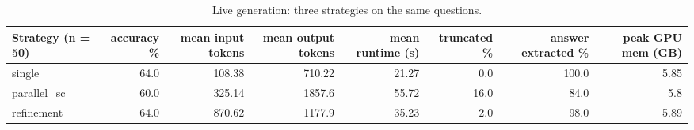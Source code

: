 \begin{table}[t]
\centering\small
\begin{tabular}{lrrrrrrr}
\toprule
Strategy (n = 50) & accuracy \% & mean input tokens & mean output tokens & mean runtime (s) & truncated \% & answer extracted \% & peak GPU mem (GB) \\
\midrule
single & 64.0 & 108.38 & 710.22 & 21.27 & 0.0 & 100.0 & 5.85 \\
parallel\_sc & 60.0 & 325.14 & 1857.6 & 55.72 & 16.0 & 84.0 & 5.8 \\
refinement & 64.0 & 870.62 & 1177.9 & 35.23 & 2.0 & 98.0 & 5.89 \\
\bottomrule
\end{tabular}
\caption{Live generation: three strategies on the same questions.}
\label{tab:task3_live}
\end{table}
